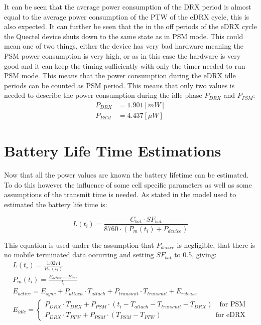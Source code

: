 It can be seen that the average power consumption of the DRX period is almost equal to the average power consumption of the PTW of the eDRX cycle, this is also expected. It can further be seen that the in the off periods of the eDRX cycle the Quectel device shuts down to the same state as in PSM mode. This could  mean one of two things, either the device has very bad hardware meaning the PSM power consumption is very high, or as in this case the hardware is very good and it can keep the timing sufficiently with only the timer needed to run PSM mode. This means that the power consumption during the eDRX idle periods can be counted as PSM period. This means that only two values is needed to describe the power consumption during the idle phase $P_{DRX}$ and $P_{PSM}$:
\begin{align}
P_{DRX} &= 1.901 [mW] \\
P_{PSM} &= 4.437 [\mu W]
\end{align}


\section{Battery Life Time Estimations}

Now that all the power values are known the battery lifetime can be estimated. To do this however the influence of some cell specific parameters as well as some assumptions of the transmit time is needed. As stated in  the model used to estimated the battery life time is:

\begin{equation}
L(t_i) = \frac{C_{bat}\cdot SF_{bat}}{8760\cdot (P_m(t_i) + P_{device})}
\end{equation}
\begin{where}
\end{where}

This equation is used under the assumption that $P_{device}$ is negligible, that there is no mobile terminated data occurring and setting $SF_{bat}$ to 0.5, giving:
\begin{equation}\label{eq:bat_est}
\begin{gathered}
	L(t_i) = \frac{1.0274}{P_m(t_i)} \\
	P_m(t_i) = \frac{E_{active} + E_{idle}}{t_i} \\
	E_{active} = E_{sync} + P_{attach}\cdot T_{attach} + P_{transmit}\cdot T_{transmit} + E_{release} \\
	E_{idle} = \begin{cases} P_{DRX}\cdot T_{DRX} + P_{PSM}\cdot (t_i - T_{attach} - T_{transmit} - T_{DRX}) \quad \text{for PSM}\\
							P_{DRX}\cdot T_{PTW} + P_{PSM} \cdot (T_{PSM} - T_{PTW}) \qquad\qquad\qquad\quad\;\;\, \text{for eDRX}
				\end{cases}
\end{gathered}
\end{equation}

